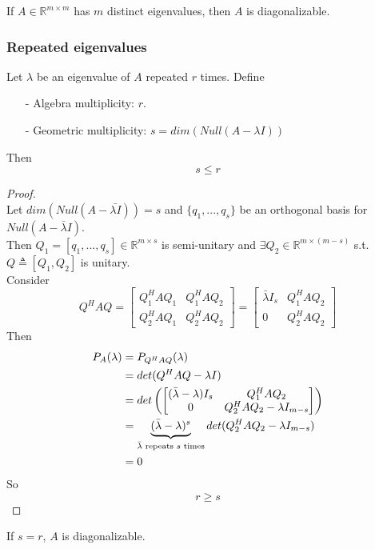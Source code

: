 \begin{multicols}{2}
If $A\in\mathbb{R}^{m\times m}$ has $m$ distinct eigenvalues, then $A$ is diagonalizable.

\subsubsection{Repeated eigenvalues}
Let $\lambda$ be an eigenvalue of $A$ repeated $r$ times. Define
\begin{itemize}
    \item [-] Algebra multiplicity: $r$.
    \item [-] Geometric multiplicity: $s=dim(Null(A-\lambda I))$
\end{itemize}
Then
\[
    s\leq r
\]
\begin{proof} \\
    Let $dim(Null(A-\bar{\lambda I}))=s$ and $\{q_1,...,q_s\}$ be an orthogonal basis for $Null(A-\bar{\lambda} I)$. \\
    Then $Q_1 = [q_1,...,q_s]\in\mathbb{R}^{m\times s}$ is semi-unitary and $\exists Q_2\in\mathbb{R}^{m\times (m-s)}$ s.t. 
    $Q\triangleq [Q_1,Q_2]$ is unitary.\\
    Consider 
    \[
        Q^HAQ = \begin{bmatrix}
            Q_1^H AQ_1 & Q_1^HAQ_2 \\
            Q_2^H AQ_1 & Q_2^HAQ_2
        \end{bmatrix} = \begin{bmatrix}
            \bar{\lambda} I_s & Q_1^HAQ_2 \\
            0 & Q_2^HAQ_2
        \end{bmatrix}
    \]
    Then
    \[
        \begin{aligned}
            P_A(\lambda) & =P_{Q^HAQ}(\lambda) \\
            & = det(Q^HAQ-\lambda I) \\
            & = det\left(\begin{bmatrix}
                (\bar{\lambda}-\lambda)I_s & Q_1^HAQ_2 \\
                0 & Q_2^HAQ_2-\lambda I_{m-s}
            \end{bmatrix}\right) \\
            & = \underbrace{(\bar{\lambda}-\lambda)^s}_{\bar{\lambda}\text{ \rm repeats } s \text{ \rm times}} det(Q_2^HAQ_2-\lambda I_{m-s}) \\
            & = 0
        \end{aligned}
    \]
    So \[r\geq s\]
\end{proof}
If $s=r$, $A$ is diagonalizable.

\end{multicols}
